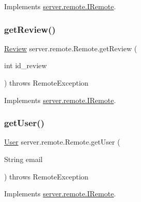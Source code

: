 Implements \hyperlink{interfaceserver_1_1remote_1_1_i_remote_a600254593b70d9757190475d3435b390}{server.\+remote.\+I\+Remote}.

\mbox{\label{classserver_1_1remote_1_1_remote_a98bd7181568c637a6cbcc0b72ebb9f95}} 
\subsubsection{\texorpdfstring{get\+Review()}{getReview()}}
{\footnotesize\ttfamily \hyperlink{classserver_1_1data_1_1_review}{Review} server.\+remote.\+Remote.\+get\+Review (\begin{DoxyParamCaption}\item[{int}]{id\+\_\+review }\end{DoxyParamCaption}) throws Remote\+Exception}



Implements \hyperlink{interfaceserver_1_1remote_1_1_i_remote_a7b3462a438579c85dc7f097acf9cec41}{server.\+remote.\+I\+Remote}.

\mbox{\label{classserver_1_1remote_1_1_remote_abef8350014445d8f2d5ffb4c088e82b6}} 
\subsubsection{\texorpdfstring{get\+User()}{getUser()}}
{\footnotesize\ttfamily \hyperlink{classserver_1_1data_1_1_user}{User} server.\+remote.\+Remote.\+get\+User (\begin{DoxyParamCaption}\item[{String}]{email }\end{DoxyParamCaption}) throws Remote\+Exception}



Implements \hyperlink{interfaceserver_1_1remote_1_1_i_remote_ab741cf58a7e2b18ba36069d14d9d04ef}{server.\+remote.\+I\+Remote}.

\mbox{\label{classserver_1_1remote_1_1_remote_a396c96a6b8802c2b4658ecccd37e84db}} 
